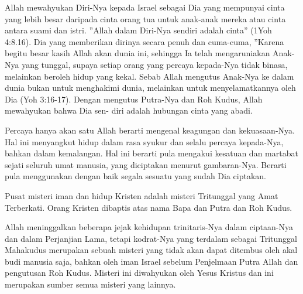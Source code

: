 \newpage
{}
\setcounter{kgkcounter}{41}
\small
{}
      Allah mewahyukan Diri-Nya kepada Israel sebagai Dia yang mempunyai cinta         yang lebih besar daripada cinta orang tua untuk anak-anak mereka atau cinta antara
suami dan istri. ”Allah dalam Diri-Nya sendiri adalah cinta” (1Yoh 4:8.16). Dia yang
memberikan dirinya secara penuh dan cuma-cuma, ”Karena begitu besar kasih
Allah akan dunia ini, sehingga Ia telah mengaruniakan Anak-Nya yang tunggal, supaya setiap orang yang percaya kepada-Nya tidak binasa, melainkan beroleh hidup yang kekal. Sebab Allah mengutus Anak-Nya ke dalam dunia bukan untuk
menghakimi dunia, melainkan untuk menyelamatkannya oleh Dia (Yoh 3:16-17).
Dengan mengutus Putra-Nya dan Roh Kudus, Allah mewahyukan bahwa Dia sen-
diri adalah hubungan cinta yang abadi.

      Percaya hanya akan satu Allah berarti mengenal keagungan dan kekuasaan-Nya. Hal ini menyangkut hidup dalam rasa syukur dan selalu percaya kepada-Nya,        
bahkan dalam kemalangan. Hal ini berarti pula mengakui kesatuan dan martabat
sejati seluruh umat manusia, yang diciptakan menurut gambaran-Nya. Berarti pula
menggunakan dengan baik segala sesuatu yang sudah Dia ciptakan.

    Pusat misteri iman dan hidup Kristen adalah misteri Tritunggal yang Amat 
Terberkati. Orang Kristen dibaptis atas nama Bapa dan Putra dan Roh Kudus.

 Allah meninggalkan beberapa jejak kehidupan trinitaris-Nya dalam ciptaan-Nya dan dalam Perjanjian Lama, tetapi kodrat-Nya yang terdalam sebagai
          Tritunggal Mahakudus merupakan sebuah misteri yang tidak akan dapat ditembus
          oleh akal budi manusia saja, bahkan oleh iman Israel sebelum Penjelmaan Putra
          Allah dan pengutusan Roh Kudus. Misteri ini diwahyukan oleh Yesus Kristus dan
          ini merupakan sumber semua misteri yang lainnya.

\normalsize